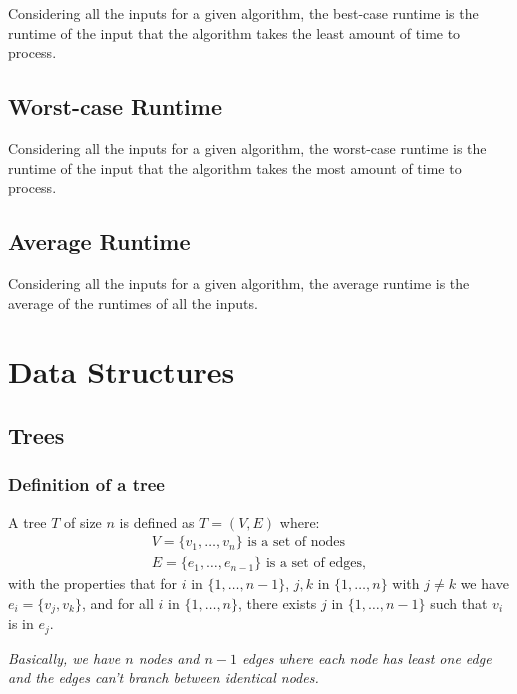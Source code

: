 \documentclass[a4paper, 12pt, twoside]{article}
\begin{document}
Considering all the inputs for a given algorithm, the best-case
runtime is the runtime of the input that the algorithm takes 
the least amount of time to process.

\subsection{Worst-case Runtime}

Considering all the inputs for a given algorithm, the worst-case
runtime is the runtime of the input that the algorithm takes 
the most amount of time to process.

\subsection{Average Runtime}

Considering all the inputs for a given algorithm, the average
runtime is the average of the runtimes of all the inputs.

\section{Data Structures}

\subsection{Trees}

\subsubsection{Definition of a tree}

A tree $T$ of size $n$ is defined as $T = (V, E)$ where:
\begin{gather*}
      V = \{v_1, \ldots, v_n\} \text{ is a set of nodes} \\
      E = \{e_1, \ldots, e_{n - 1}\} \text{ is a set of edges},
\end{gather*} 
with the properties that for $i$ in $\{1, \ldots, n - 1\}$, 
$j, k$ in $\{1, \ldots, n\}$ with $j \neq k$ we have 
$e_i = \{v_j, v_k\}$, and for all $i$ in $\{1, \ldots, n\}$, 
there exists $j$ in $\{1, \ldots, n - 1\}$ such that $v_i$ 
is in $e_j$.

\vspace{\baselineskip}

\textit{Basically, we have $n$ nodes and $n - 1$ edges where each
node has least one edge and the edges can't branch between 
identical nodes.}
\end{document}

